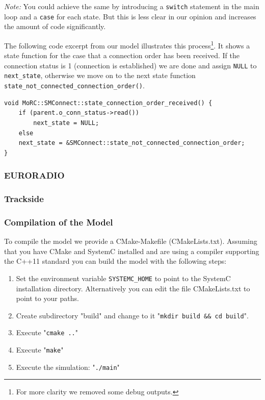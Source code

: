 \documentclass{template/openetcs_article}
\begin{document}
\emph{Note:} You could achieve the same by introducing a \verb|switch| statement in the main loop and a \verb|case| for each state. But this is less clear in our opinion and increases the amount of code significantly.

The following code excerpt from our model illustrates this process\footnote{For more clarity we removed some debug outputs.}. It shows a state function for the case that a connection order has been received. If the connection status is 1 (connection is established) we are done and assign \verb|NULL| to \verb|next_state|, otherwise we move on to the next state function \verb|state_not_connected_connection_order()|.

{\small
\begin{lstlisting}
void MoRC::SMConnect::state_connection_order_received() {
    if (parent.o_conn_status->read())
        next_state = NULL;
    else 
	next_state = &SMConnect::state_not_connected_connection_order;
}
\end{lstlisting}}


\subsubsection{EURORADIO}

\subsubsection{Trackside}



\subsubsection{Compilation of the Model}

To compile the model we provide a CMake-Makefile (CMakeLists.txt). Assuming that you have CMake and SystemC installed and are using a compiler supporting the C++11 standard you can build the model with the following steps:

\begin{enumerate}
  \item Set the environment variable \verb|SYSTEMC_HOME| to point to the SystemC installation directory. Alternatively you can edit the file CMakeLists.txt to point to your paths. 
  \item Create subdirectory "build" and change to it "\verb|mkdir build && cd build|". 
  \item Execute "\verb|cmake ..|" 
  \item Execute "\verb|make|" 
  \item Execute the simulation: "\verb|./main|" 
\end{enumerate}
\end{document}
